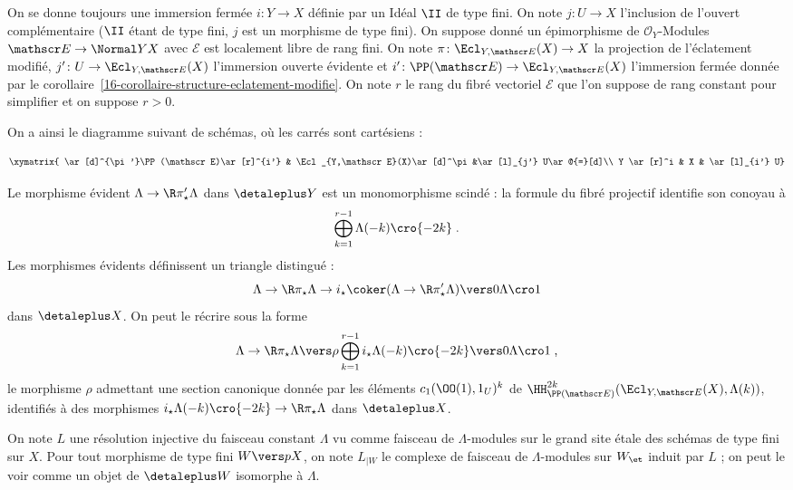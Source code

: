 \documentclass[10pt]{../fichiers-configuration-latex/smfart}
\begin{document}
On se donne toujours une immersion fermée $i\colon Y\to X$ définie par un
Idéal $\II$ de type fini. On note $j\colon U\to X$ l'inclusion de l'ouvert
complémentaire ($\II$ étant de type fini, $j$ est un morphisme de 
type fini). On suppose donné un épimorphisme de $\mathscr O_Y$-Modules
$\mathscr E \to \Normal Y X$
avec $\mathscr E$ est localement libre de rang
fini. On note $\pi\colon \Ecl_{Y,\mathscr E}(X)\to X$ la projection de
l'éclatement modifié, $j'\colon U\to \Ecl_{Y,\mathscr E}(X)$ l'immersion
ouverte évidente et $i'\colon \PP(\mathscr E)\to \Ecl_{Y,\mathscr E}(X)$
l'immersion fermée donnée par le 
corollaire~\ref{16-corollaire-structure-eclatement-modifie}. On note $r$ le
rang du fibré vectoriel $\mathscr E$ que l'on suppose de rang constant pour
simplifier et on suppose $r>0$.

On a ainsi le diagramme suivant de schémas, où les carrés sont cartésiens :

\[
\xymatrix{
\ar[d]^{\pi'}\PP(\mathscr E)\ar[r]^{i'} & 
\Ecl_{Y,\mathscr E}(X)\ar[d]^\pi &\ar[l]_{j'} U\ar@{=}[d]\\
Y \ar[r]^i & X & \ar[l]_{i'} U}
\]

\begin{proposition3}
\label{16-proposition-cohomologie-eclatement}
Le morphisme évident $\Lambda\to \R\pi'_\star\Lambda$ dans $\detaleplus Y$
est un monomorphisme scindé : la formule du fibré projectif identifie son
conoyau à 
\[\bigoplus_{k=1}^{r-1} \Lambda(-k)\cro{-2k}\;\text{.}\]
Les morphismes évidents définissent un triangle distingué :
\[\Lambda\to \R\pi_\star\Lambda \to
i_\star\coker(\Lambda\to \R\pi'_\star \Lambda)\vers 0 \Lambda\cro 1\]
dans $\detaleplus X$. On peut le récrire sous la forme
\[\Lambda\to \R\pi_\star\Lambda \vers \rho
\bigoplus_{k=1}^{r-1}i_\star\Lambda(-k)\cro{-2k}\vers 0 \Lambda\cro
1\;\text{,}\]
le morphisme $\rho$ admettant une section canonique
donnée par les éléments
$c_1(\OO(1),1_U)^k$ de $\HH^{2k}_{\PP(\mathscr E)}(\Ecl_{Y,\mathscr
E}(X),\Lambda(k))$, identifiés à des morphismes 
$i_\star \Lambda(-k)\cro {-2k}\to \R\pi_\star \Lambda$ dans $\detaleplus X$.
\end{proposition3}

On note $L$ une résolution injective du faisceau constant $\Lambda$ vu
comme faisceau de $\Lambda$-modules sur le grand site étale
des schémas de type fini sur $X$. Pour tout morphisme de type fini $W\vers
p X$, on note $L_{|W}$ le complexe de faisceau de $\Lambda$-modules sur
$W_\et$ induit par $L$ ; on peut le voir comme un objet de $\detaleplus W$
isomorphe à $\Lambda$.
\end{document}
